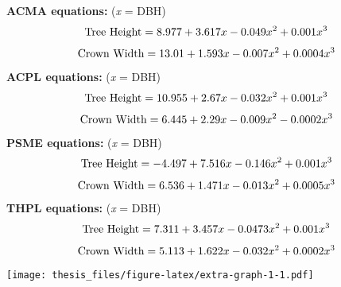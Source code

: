 \documentclass[12pt,twoside]{reedthesis}
\begin{document}
\textbf{ACMA equations:} (\textit{x} = DBH)
\begin{equation}
\textrm{Tree Height} = 8.977 + 3.617x -0.049x^{2} + 0.001x^{3}  \\
\end{equation}
\begin{equation}
\textrm{Crown Width} = 13.01 + 1.593x - 0.007x^{2} + 0.0004x^{3} \\
\end{equation}
\textbf{ACPL equations:} (\textit{x} = DBH)
\begin{equation}
\textrm{Tree Height} = 10.955+ 2.67x -0.032x^2 + 0.001x^3  \\
\end{equation}
\begin{equation}
\textrm{Crown Width} = 6.445 + 2.29x - 0.009x^2 - 0.0002x^3 \\
\end{equation}
\textbf{PSME equations:} (\textit{x} = DBH)
\begin{equation}
\textrm{Tree Height} = -4.497 + 7.516x - 0.146x^2 + 0.001x^3 \\
\end{equation}
\begin{equation}
\textrm{Crown Width} = 6.536 + 1.471x - 0.013x^2 + 0.0005x^3 \\
\end{equation}
\textbf{THPL equations:} (\textit{x} = DBH)
\begin{equation}
\textrm{Tree Height} = 7.311 + 3.457x - 0.0473x^2 + 0.001x^3 \\
\end{equation}
\begin{equation}
\textrm{Crown Width} = 5.113 + 1.622x - 0.032x^2 + 0.0002x^3 \\
\end{equation}
\texttt{[image: thesis\_files/figure-latex/extra-graph-1-1.pdf]}
\end{document}
